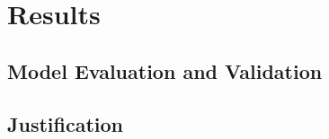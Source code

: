 \documentclass[paper=A4, parskip=half]{scrartcl}
\begin{document}

\section*{Results}

\subsection*{Model Evaluation and Validation}


\subsection*{Justification}

\end{document}
